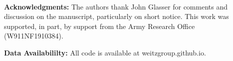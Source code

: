 \mbox{}\\
\noindent
\textbf{Acknowledgments:} The authors thank John Glasser for comments
and discussion on the manuscript, particularly on short notice. 
This work was supported, in part,
by support from the Army Research Office (W911NF1910384).

\noindent
\textbf{Data Availabililty:} All code is available at weitzgroup.github.io.
